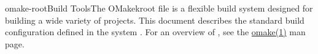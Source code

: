 %
%
%
\begin{Name}{1}{omake-root}{\authors}{Build Tools}{The OMakekroot file}
   is a flexible build system designed for building a wide variety of projects.
  This document describes the standard build configuration defined in the system .
  For an overview of , see the \href{omake.html}{omake(1)} man page.
\end{Name}

